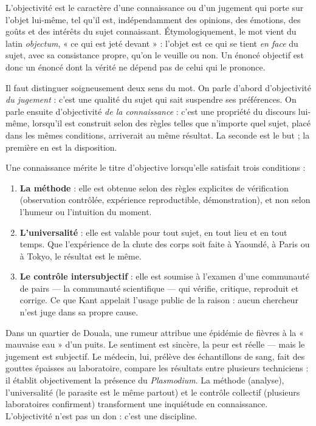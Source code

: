 \documentclass[11pt]{article}
\newcommand{\cle}[1]{{\popxbold\color{popdark}#1}}
\begin{document}
\begin{definition}[L'objectivité]
L'\cle{objectivité} est le caractère d'une connaissance ou d'un jugement qui porte sur l'\cle{objet} lui-même, tel qu'il est, indépendamment des opinions, des émotions, des goûts et des intérêts du sujet connaissant. Étymologiquement, le mot vient du latin \emph{objectum}, « ce qui est jeté devant » : l'objet est ce qui se tient \emph{en face} du sujet, avec sa consistance propre, qu'on le veuille ou non. Un énoncé objectif est donc un énoncé dont la vérité ne dépend pas de celui qui le prononce.
\end{definition}

Il faut distinguer soigneusement deux sens du mot. On parle d'abord d'objectivité \emph{du jugement} : c'est une qualité du sujet qui sait suspendre ses préférences. On parle ensuite d'objectivité \emph{de la connaissance} : c'est une propriété du discours lui-même, lorsqu'il est construit selon des règles telles que n'importe quel sujet, placé dans les mêmes conditions, arriverait au même résultat. La seconde est le but ; la première en est la disposition.

\begin{propriete}
Une connaissance mérite le titre d'objective lorsqu'elle satisfait trois conditions :
\begin{enumerate}
\item \textbf{La méthode} : elle est obtenue selon des règles explicites de vérification (observation contrôlée, expérience reproductible, démonstration), et non selon l'humeur ou l'intuition du moment.
\item \textbf{L'universalité} : elle est valable pour tout sujet, en tout lieu et en tout temps. Que l'expérience de la chute des corps soit faite à Yaoundé, à Paris ou à Tokyo, le résultat est le même.
\item \textbf{Le contrôle intersubjectif} : elle est soumise à l'examen d'une communauté de pairs — la communauté scientifique — qui vérifie, critique, reproduit et corrige. Ce que Kant appelait l'usage public de la raison : aucun chercheur n'est juge dans sa propre cause.
\end{enumerate}
\end{propriete}

\begin{exemplebox}
Dans un quartier de Douala, une rumeur attribue une épidémie de fièvres à la « mauvaise eau » d'un puits. Le sentiment est sincère, la peur est réelle — mais le jugement est subjectif. Le médecin, lui, prélève des échantillons de sang, fait des gouttes épaisses au laboratoire, compare les résultats entre plusieurs techniciens : il établit objectivement la présence du \emph{Plasmodium}. La méthode (analyse), l'universalité (le parasite est le même partout) et le contrôle collectif (plusieurs laboratoires confirment) transforment une inquiétude en connaissance. L'objectivité n'est pas un don : c'est une discipline.
\end{exemplebox}
\end{document}
